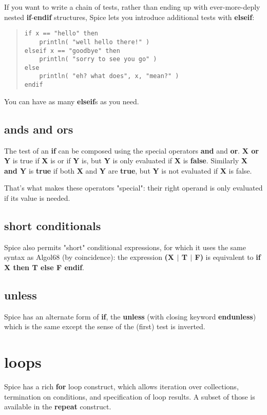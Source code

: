 \documentclass{report}
\begin{document}
If you want to write a chain of tests, rather than ending up with
ever-more-deply nested {\bf if}-{\bf endif} structures, Spice lets you introduce
additional tests with {\bf elseif}:

\begin{quote}
\begin{verbatim}
if x == "hello" then
    println( "well hello there!" )
elseif x == "goodbye" then
    println( "sorry to see you go" )
else
    println( "eh? what does", x, "mean?" )
endif
\end{verbatim}
\end{quote}


You can have as many {\bf elseif}s as you need.

\section{ands and ors}


The test of an {\bf if} can be composed using the special operators {\bf and} and
{\bf or}. {\bf X or Y} is true if {\bf X} is or if {\bf Y} is, but {\bf Y} is only evaluated if
{\bf X} is {\bf false}. Similarly {\bf X and Y} is {\bf true} if both {\bf X} and {\bf Y} are {\bf true},
but {\bf Y} is not evaluated if {\bf X} is false.

That's what makes these operators "special": their right operand is only
evaluated if its value is needed.

\section{short conditionals}


Spice also permits "short" conditional expressions, for which it uses the same
syntax as Algol68 (by coincidence): the expression {\bf (X $\mid$ T $\mid$ F)} is
equivalent to {\bf if X then T else F endif}.

\section{unless}


Spice has an alternate form of {\bf if}, the {\bf unless} (with closing keyword
{\bf endunless}) which is the same except the sense of the (first) test is
inverted.\chapter{loops}


Spice has a rich {\bf for} loop construct, which allows iteration over
collections, termination on conditions, and specification of loop results.
A subset of those is available in the {\bf repeat} construct.
\end{document}
